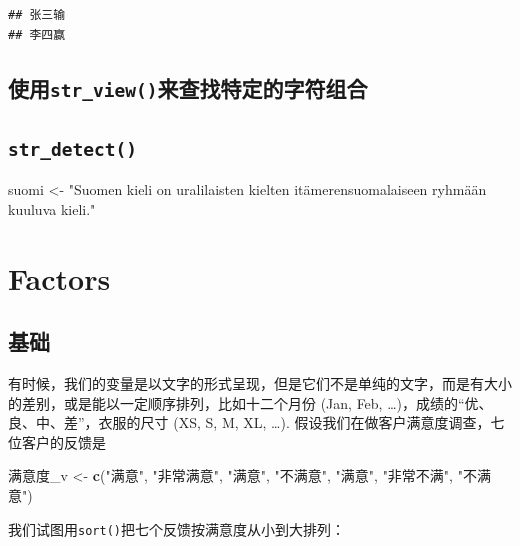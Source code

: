 \documentclass[]{book}
\newenvironment{Shaded}{\begin{snugshade}}{\end{snugshade}}
\newcommand{\KeywordTok}[1]{\textcolor[rgb]{0.13,0.29,0.53}{\textbf{#1}}}
\newcommand{\NormalTok}[1]{#1}
\newcommand{\StringTok}[1]{\textcolor[rgb]{0.31,0.60,0.02}{#1}}
\begin{document}
\begin{verbatim}
## 张三输
## 李四赢
\end{verbatim}

\hypertarget{str_view}{%
\subsection{\texorpdfstring{使用\texttt{str\_view()}来查找特定的字符组合}{使用str\_view()来查找特定的字符组合}}\label{str_view}}

\hypertarget{str_detect}{%
\subsection{\texorpdfstring{\texttt{str\_detect()}}{str\_detect()}}\label{str_detect}}

\begin{Shaded}
\begin{Highlighting}[]
\NormalTok{suomi <-}\StringTok{ "Suomen kieli on uralilaisten kielten itämerensuomalaiseen ryhmään kuuluva kieli."}
\end{Highlighting}
\end{Shaded}

\hypertarget{factors}{%
\section{Factors}\label{factors}}

\hypertarget{-1}{%
\subsection{基础}\label{-1}}

有时候，我们的变量是以文字的形式呈现，但是它们不是单纯的文字，而是有大小的差别，或是能以一定顺序排列，比如十二个月份 (Jan, Feb, \ldots{})，成绩的``优、良、中、差''，衣服的尺寸 (XS, S, M, XL, \ldots{}). 假设我们在做客户满意度调查，七位客户的反馈是

\begin{Shaded}
\begin{Highlighting}[]
\NormalTok{满意度_v <-}\StringTok{ }\KeywordTok{c}\NormalTok{(}\StringTok{"满意"}\NormalTok{, }\StringTok{"非常满意"}\NormalTok{, }\StringTok{"满意"}\NormalTok{, }\StringTok{"不满意"}\NormalTok{, }\StringTok{"满意"}\NormalTok{, }\StringTok{"非常不满"}\NormalTok{,  }\StringTok{"不满意"}\NormalTok{)}
\end{Highlighting}
\end{Shaded}

我们试图用\texttt{sort()}把七个反馈按满意度从小到大排列：
\end{document}
